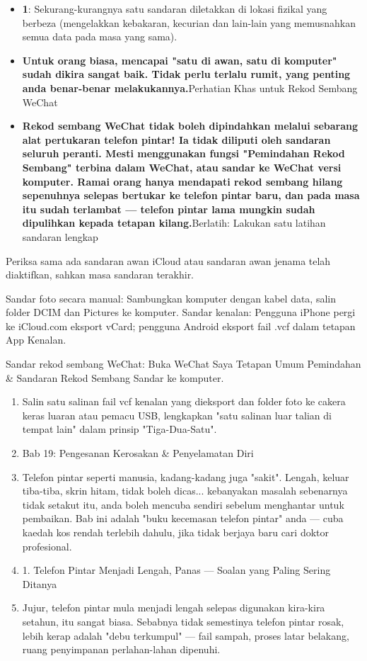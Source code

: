\begin{itemize}
  \item \textbf{1}: Sekurang-kurangnya satu sandaran diletakkan di lokasi fizikal yang berbeza (mengelakkan kebakaran, kecurian dan lain-lain yang memusnahkan semua data pada masa yang sama).
  \item \textbf{Untuk orang biasa, mencapai "satu di awan, satu di komputer" sudah dikira sangat baik. Tidak perlu terlalu rumit, yang penting anda benar-benar melakukannya.}Perhatian Khas untuk Rekod Sembang WeChat
  \item \textbf{Rekod sembang WeChat tidak boleh dipindahkan melalui sebarang alat pertukaran telefon pintar! Ia tidak diliputi oleh sandaran seluruh peranti. Mesti menggunakan fungsi "Pemindahan Rekod Sembang" terbina dalam WeChat, atau sandar ke WeChat versi komputer. Ramai orang hanya mendapati rekod sembang hilang sepenuhnya selepas bertukar ke telefon pintar baru, dan pada masa itu sudah terlambat — telefon pintar lama mungkin sudah dipulihkan kepada tetapan kilang.}Berlatih: Lakukan satu latihan sandaran lengkap
\end{itemize}

Periksa sama ada sandaran awan iCloud atau sandaran awan jenama telah diaktifkan, sahkan masa sandaran terakhir.

\begin{tcbwarn}{Sandar foto secara manual: Sambungkan komputer dengan kabel data, salin folder DCIM dan Pictures ke komputer.}
Sandar kenalan: Pengguna iPhone pergi ke iCloud.com eksport vCard; pengguna Android eksport fail .vcf dalam tetapan App Kenalan.

\end{tcbwarn}

\begin{tcbpractice}{Sandar rekod sembang WeChat: Buka WeChat Saya Tetapan Umum Pemindahan \& Sandaran Rekod Sembang Sandar ke komputer.}
\begin{enumerate}
  \item Salin satu salinan fail vcf kenalan yang dieksport dan folder foto ke cakera keras luaran atau pemacu USB, lengkapkan "satu salinan luar talian di tempat lain" dalam prinsip "Tiga-Dua-Satu".
  \item Bab 19: Pengesanan Kerosakan \& Penyelamatan Diri
  \item Telefon pintar seperti manusia, kadang-kadang juga "sakit". Lengah, keluar tiba-tiba, skrin hitam, tidak boleh dicas... kebanyakan masalah sebenarnya tidak setakut itu, anda boleh mencuba sendiri sebelum menghantar untuk pembaikan. Bab ini adalah "buku kecemasan telefon pintar" anda — cuba kaedah kos rendah terlebih dahulu, jika tidak berjaya baru cari doktor profesional.
  \item 1. Telefon Pintar Menjadi Lengah, Panas — Soalan yang Paling Sering Ditanya
  \item Jujur, telefon pintar mula menjadi lengah selepas digunakan kira-kira setahun, itu sangat biasa. Sebabnya tidak semestinya telefon pintar rosak, lebih kerap adalah "debu terkumpul" — fail sampah, proses latar belakang, ruang penyimpanan perlahan-lahan dipenuhi.
\end{enumerate}

\end{tcbpractice}
